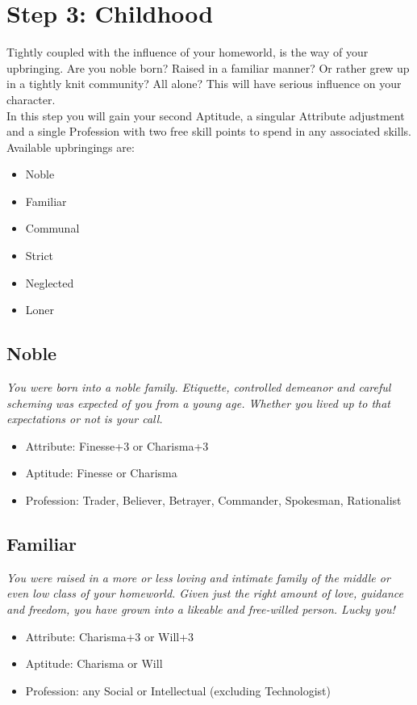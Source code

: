 
\section{Step 3: Childhood} %
	\label{sec:lifepath_3_childhood}
	Tightly coupled with the influence of your homeworld, is the way of your upbringing. Are you noble born? Raised in a familiar manner? Or rather grew up in a tightly knit community? All alone? This will have serious influence on your character.\\
	In this step you will gain your second Aptitude, a singular Attribute adjustment and a single Profession with two free skill points to spend in any associated skills. Available upbringings are:
	\begin{itemize}
		\item Noble
		\item Familiar
		\item Communal
		\item Strict
		\item Neglected
		\item Loner
	\end{itemize}

	\subsection{Noble}
	\textit{You were born into a noble family. Etiquette, controlled demeanor and careful scheming was expected of you from a young age. Whether you lived up to that expectations or not is your call.}
	\begin{itemize}
		\item Attribute: Finesse+3 or Charisma+3
		\item Aptitude: Finesse or Charisma
		\item Profession: Trader, Believer, Betrayer, Commander, Spokesman, Rationalist
	\end{itemize}

	\subsection{Familiar}
	\textit{You were raised in a more or less loving and intimate family of the middle or even low class of your homeworld. Given just the right amount of love, guidance and freedom, you have grown into a likeable and free-willed person. Lucky you!}
	\begin{itemize}
		\item Attribute: Charisma+3 or Will+3
		\item Aptitude: Charisma or Will
		\item Profession: any Social or Intellectual (excluding Technologist)
	\end{itemize}

